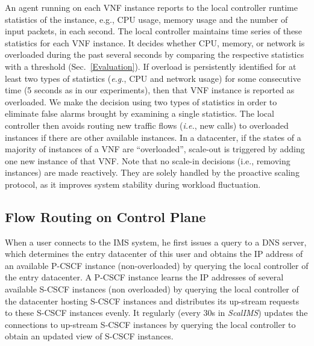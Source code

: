 An agent running on each VNF instance reports to the local controller runtime statistics of the instance, e.g., CPU usage, memory usage and the number of input packets, in each second. The local controller maintains time series of these statistics for each VNF instance. It decides whether CPU, memory, or network is overloaded during the past several seconds by comparing the respective statistics with a threshold (Sec.~\ref{Evaluation}). If overload is persistently identified for at least two types of statistics ({\em e.g.}, CPU and network usage) for some consecutive time (5 seconds as in our experiments), then that VNF instance is reported as overloaded. We make the decision using two types of statistics in order to eliminate false alarms brought by examining a single statistics. The local controller then avoids routing new traffic flows ({\em i.e.}, new calls) to overloaded instances if there are other available instances. In a datacenter, if the states of a majority of instances of a VNF are ``overloaded'', scale-out is triggered by adding one new instance of that VNF. Note that no scale-in decisions (i.e., removing instances) are made reactively. They are solely handled by the proactive scaling protocol, as it improves system stability during workload fluctuation.

\subsection{Flow Routing on Control Plane}
\label{sec:message-routing-on-control-plane}

When a user connects to the IMS system, he first issues a query to a DNS server, which determines the entry datacenter of this user and obtains the IP address of an available P-CSCF instance (non-overloaded) by querying the local controller of the entry datacenter. A P-CSCF instance learns the IP addresses of several available S-CSCF instances (non overloaded) by querying the local controller of the datacenter hosting S-CSCF instances and distributes its up-stream requests to these S-CSCF instances evenly. It regularly (every 30s in \textit{ScalIMS}) updates the connections to up-stream S-CSCF instances by querying the local controller to obtain an updated view of S-CSCF instances.




